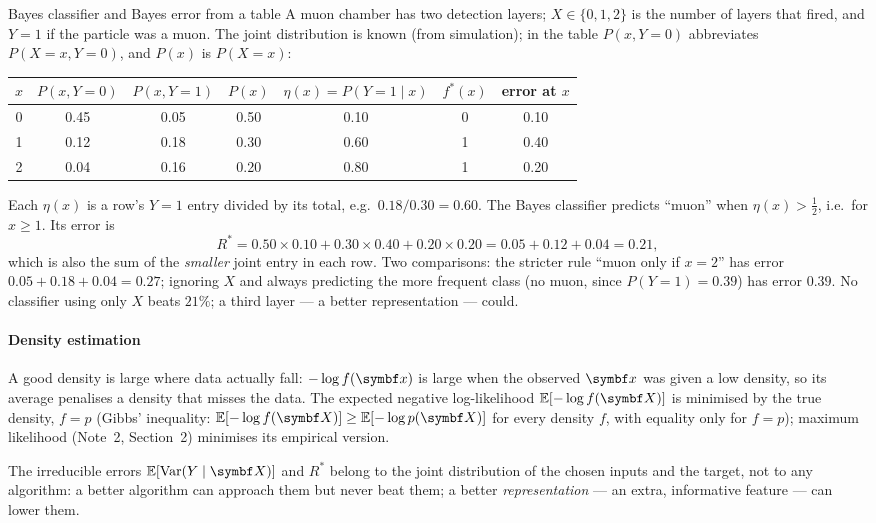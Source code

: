 \documentclass[11pt]{article}
\begin{document}
\begin{worked}{Bayes classifier and Bayes error from a table}
A muon chamber has two detection layers; $X \in \{0, 1, 2\}$ is the number of layers that fired, and $Y = 1$ if the
particle was a muon. The joint distribution is known (from simulation); in the table $P(x, Y{=}0)$ abbreviates
$P(X{=}x, Y{=}0)$, and $P(x)$ is $P(X{=}x)$:
\begin{center}\small
\begin{tabular}{@{}c|cc|c|c|c|c@{}}\toprule
$x$ & $P(x, Y{=}0)$ & $P(x, Y{=}1)$ & $P(x)$ & $\eta(x) = P(Y{=}1 \mid x)$ & $f^*(x)$ & error at $x$ \\ \midrule
0 & 0.45 & 0.05 & 0.50 & 0.10 & 0 & 0.10 \\
1 & 0.12 & 0.18 & 0.30 & 0.60 & 1 & 0.40 \\
2 & 0.04 & 0.16 & 0.20 & 0.80 & 1 & 0.20 \\ \bottomrule
\end{tabular}
\end{center}
Each $\eta(x)$ is a row's $Y{=}1$ entry divided by its total, e.g.\ $0.18 / 0.30 = 0.60$. The Bayes classifier
predicts ``muon'' when $\eta(x) > \tfrac12$, i.e.\ for $x \ge 1$. Its error is
\[
  R^* = 0.50 \times 0.10 + 0.30 \times 0.40 + 0.20 \times 0.20 = 0.05 + 0.12 + 0.04 = 0.21 ,
\]
which is also the sum of the \emph{smaller} joint entry in each row. Two comparisons: the stricter rule ``muon only if
$x = 2$'' has error $0.05 + 0.18 + 0.04 = 0.27$; ignoring $X$ and always predicting the more frequent class (no muon,
since $P(Y{=}1) = 0.39$) has error $0.39$. No classifier using only $X$ beats $21\%$; a third layer --- a better
representation --- could.
\end{worked}

\paragraph{Density estimation} A good density is large where data actually fall: $-\log f(\x)$ is large when the
observed $\x$ was given a low density, so its average penalises a density that misses the data. The expected negative
log-likelihood $\E[-\log f(\X)]$ is minimised by the true density, $f = p$ (Gibbs' inequality: $\E[-\log f(\X)] \ge
\E[-\log p(\X)]$ for every density $f$, with equality only for $f = p$); maximum likelihood (Note~2, Section~2) minimises its empirical version.

\begin{keyidea}
The irreducible errors $\E[\Var(Y \mid \X)]$ and $R^*$ belong to the joint distribution of the chosen inputs and the
target, not to any algorithm: a better algorithm can approach them but never beat them; a better
\emph{representation} --- an extra, informative feature --- can lower them.
\end{keyidea}
\end{document}

